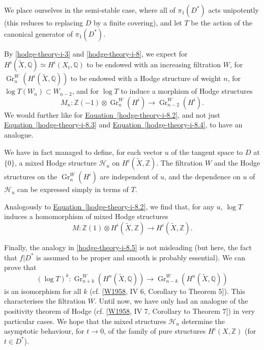   We place ourselves in the semi-stable case, where all of \(\pi _1(D^*)\) acts unipotently (this reduces to replacing \(D\) by a finite covering), and let \(T\) be the action of the canonical generator of \(\pi _1(D^*)\).\par{}By \cref{hodge-theory-i-3} and \cref{hodge-theory-i-8}, we expect for \(H^i(\widetilde {X},\mathbb {Q})\simeq  H^i(X_t,\mathbb {Q})\) to be endowed with an increasing filtration \(W\), for \(\operatorname {Gr}_n^W(H^i(\widetilde {X},\mathbb {Q}))\) to be endowed with a Hodge structure of weight \(n\), for \(\log  T(W_n)\subset  W_{n-2}\), and for \(\log  T\) to induce a morphism of Hodge structures
  \[     M_n\colon  \mathbb {Z}(-1)\otimes \operatorname {Gr}_n^W(H^i)     \to  \operatorname {Gr}_{n-2}^W(H^i).   \]
  We would further like for \hyperref[hodge-theory-i-8.2]{Equation~\ref*{hodge-theory-i-8.2}}, and not just \hyperref[hodge-theory-i-8.3]{Equation~\ref*{hodge-theory-i-8.3}} and \hyperref[hodge-theory-i-8.4]{Equation~\ref*{hodge-theory-i-8.4}}, to have an analogue.\par{}We have in fact managed to define, for each vector \(u\) of the tangent space to \(D\) at \(\{0\}\), a mixed Hodge structure \(\mathscr {H}_u\) on \(H^i(\widetilde {X},\mathbb {Z})\).
  The filtration \(W\) and the Hodge structures on the \(\operatorname {Gr}_n^W(H^i)\) are independent of \(u\), and the dependence on \(u\) of \(\mathscr {H}_u\) can be expressed simply in terms of \(T\).
  
  Analogously to \hyperref[hodge-theory-i-8.2]{Equation~\ref*{hodge-theory-i-8.2}}, we find that, for any \(u\), \(\log  T\) induces a homomorphism of mixed Hodge structures
  \[     M\colon  \mathbb {Z}(1)\otimes  H^i(\widetilde {X},\mathbb {Z})     \to  H^i(\widetilde {X},\mathbb {Z}).   \]\par{}Finally, the analogy in \cref{hodge-theory-i-8.5} is not misleading (but here, the fact that \(f|D^*\) is assumed to be proper and smooth is probably essential).
  We can prove that
  \[     (\log  T)^k\colon  \operatorname {Gr}_{n+k}^W(H^n(\widetilde {X},\mathbb {Q}))     \to  \operatorname {Gr}_{n-k}^W(H^n(\widetilde {X},\mathbb {Q}))   \]
  is an isomorphism for all \(k\) (cf. [\hyperref[W1958]{W1958}, IV 6, Corollary to Theorem 5]).
  This characterises the filtration \(W\).
  Until now, we have only had an analogue of the positivity theorem of Hodge (cf. [\hyperref[W1958]{W1958}, IV 7, Corollary to Theorem 7]) in very particular cases.
  We hope that the mixed structures \(\mathscr {H}_u\) determine the asymptotic behaviour, for \(t\to 0\), of the family of pure structures \(H^i(X,\mathbb {Z})\) (for \(t\in  D^*\)).